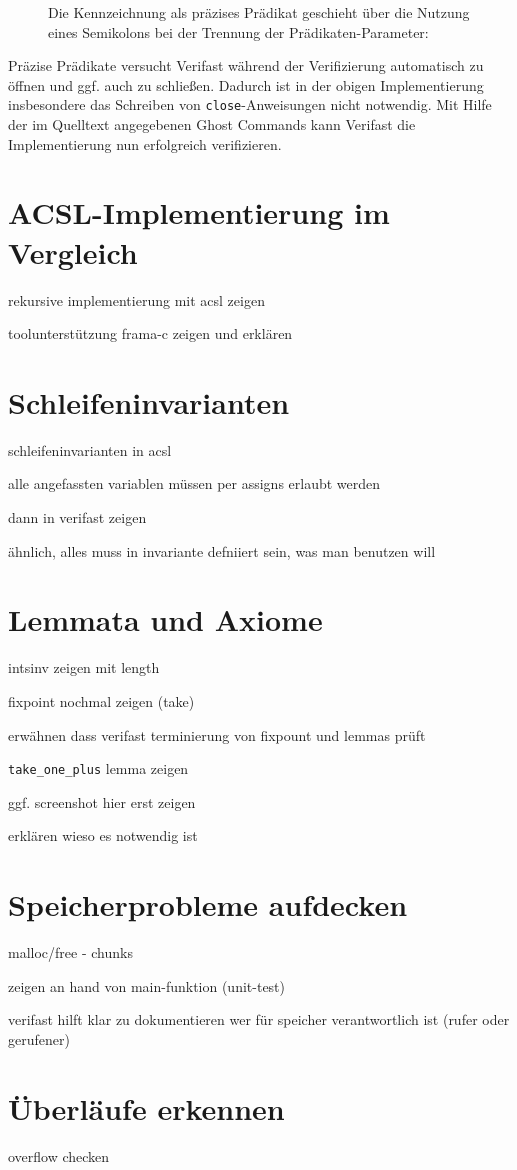 \begin{figure}[H]
Die Kennzeichnung als präzises Prädikat geschieht über die Nutzung eines Semikolons bei der Trennung
der Prädikaten-Parameter:


\end{figure}

Präzise Prädikate versucht Verifast während der Verifizierung automatisch zu öffnen und ggf. auch zu
schließen. Dadurch ist in der obigen Implementierung insbesondere das Schreiben von \texttt{close}-Anweisungen
nicht notwendig.
\newline
\newline
Mit Hilfe der im Quelltext angegebenen Ghost Commands kann Verifast die Implementierung nun erfolgreich
verifizieren.

\section{ACSL-Implementierung im Vergleich}

rekursive implementierung mit acsl zeigen

toolunterstützung frama-c zeigen und erklären

\section{Schleifeninvarianten}

schleifeninvarianten in acsl

alle angefassten variablen müssen per assigns erlaubt werden

dann in verifast zeigen

ähnlich, alles muss in invariante defniiert sein, was man benutzen will

\section{Lemmata und Axiome}

intsinv zeigen mit length

fixpoint nochmal zeigen (take)

erwähnen dass verifast terminierung von fixpount und lemmas prüft

\lstinline{take_one_plus} lemma zeigen

ggf. screenshot hier erst zeigen

erklären wieso es notwendig ist

\section{Speicherprobleme aufdecken}

malloc/free - chunks

zeigen an hand von main-funktion (unit-test)

verifast hilft klar zu dokumentieren wer für speicher verantwortlich ist (rufer oder gerufener)

\section{Überläufe erkennen}

overflow checken
